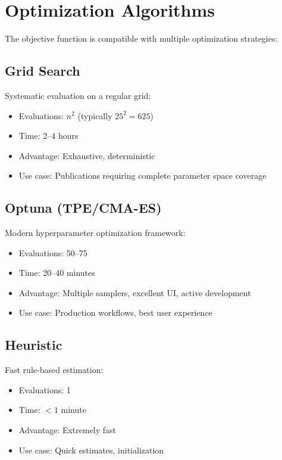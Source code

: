 \documentclass[11pt,a4paper]{article}
\begin{document}
\section{Optimization Algorithms}

The objective function is compatible with multiple optimization strategies:

\subsection{Grid Search}

Systematic evaluation on a regular grid:
\begin{itemize}
    \item Evaluations: $n^2$ (typically $25^2 = 625$)
    \item Time: 2--4 hours
    \item Advantage: Exhaustive, deterministic
    \item Use case: Publications requiring complete parameter space coverage
\end{itemize}

\subsection{Optuna (TPE/CMA-ES)}

Modern hyperparameter optimization framework:
\begin{itemize}
    \item Evaluations: 50--75
    \item Time: 20--40 minutes
    \item Advantage: Multiple samplers, excellent UI, active development
    \item Use case: Production workflows, best user experience
\end{itemize}

\subsection{Heuristic}

Fast rule-based estimation:
\begin{itemize}
    \item Evaluations: 1
    \item Time: $<1$ minute
    \item Advantage: Extremely fast
    \item Use case: Quick estimates, initialization
\end{itemize}
\end{document}

